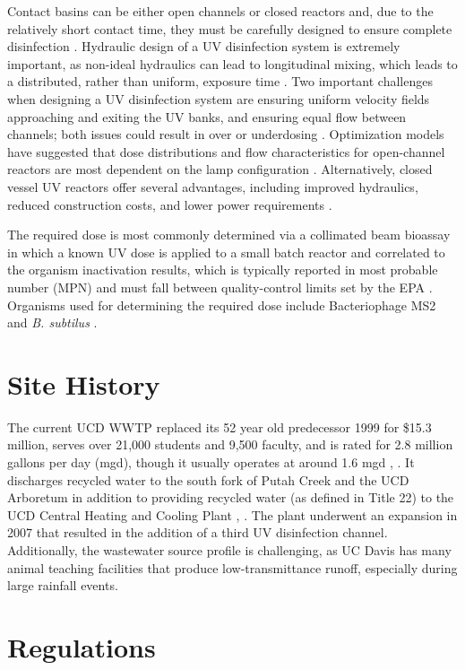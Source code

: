 \documentclass[11pt,letterpaper,final]{report}
\begin{document}
Contact basins can be either open channels or closed reactors and, due to the relatively short contact time, they must be carefully designed to ensure complete disinfection \cite{Metcalf}. Hydraulic design of a UV disinfection system is extremely important, as non-ideal hydraulics can lead to longitudinal mixing, which leads to a distributed, rather than uniform, exposure time \cite{Metcalf}. Two important challenges when designing a UV disinfection system are ensuring uniform velocity fields approaching and exiting the UV banks, and ensuring equal flow between channels; both issues could result in over or underdosing \cite{Metcalf}. Optimization models have suggested that dose distributions and flow characteristics for open-channel reactors are most dependent on the lamp configuration \cite{Sultan2019}. Alternatively, closed vessel UV reactors offer several advantages, including improved hydraulics, reduced construction costs, and lower power requirements \cite{Evoqua}. 

The required dose is most commonly determined via a collimated beam bioassay in which a known UV dose is applied to a small batch reactor and correlated to the organism inactivation results, which is typically reported in most probable number (MPN) and must fall between quality-control limits set by the EPA \cite{Metcalf}. Organisms used for determining the required dose include Bacteriophage MS2 and \textit{B. subtilus} \cite{Metcalf}.

\section{Site History}

The current UCD WWTP replaced its 52 year old predecessor 1999 for \$15.3 million, serves over 21,000 students and 9,500 faculty, and is rated for 2.8 million gallons per day (mgd), though it usually operates at around 1.6 mgd \cite{Kerlin}, \cite{Facilities}. It discharges recycled water to the south fork of Putah Creek and the UCD Arboretum in addition to providing recycled water (as defined in Title 22) to the UCD Central Heating and Cooling Plant \cite{NPDES}, \cite{DaveJones}. The plant underwent an expansion in 2007 that resulted in the addition of a third UV disinfection channel. Additionally, the wastewater source profile is challenging, as UC Davis has many animal teaching facilities that produce low-transmittance runoff, especially during large rainfall events.

\section{Regulations} 
\end{document}
